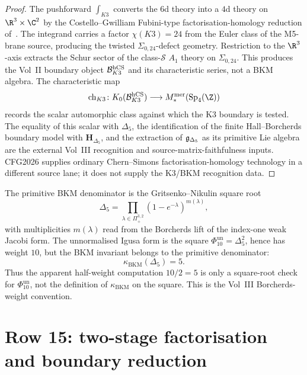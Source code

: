 \begin{proof}
The pushforward $\int_{K3}$ converts the
6d theory into a $4$d theory on $\R^3\times\C^2$ by the
Costello--Gwilliam Fubini-type factorisation-homology reduction
of~\cite[Ch.~3, \S3.6]{CG17}. The integrand carries a factor
$\chi(K3) = 24$ from the Euler class of the M5-brane source,
producing the twisted $\Sigma_{0,24}$-defect geometry. Restriction
to the $\R^3$-axis extracts the Schur sector of the
class-$\mathcal S$ $A_1$ theory on $\Sigma_{0,24}$. This produces the
Vol~II boundary object $\mathcal{B}^{\mathrm{hCS}}_{K3}$ and its characteristic series,
not a BKM algebra. The characteristic map
\[
 \mathrm{ch}_{K3}\colon
 K_0(\cB^{\hCS}_{K3}) \longrightarrow
 M^{\mathrm{mer}}_{\ast}(\mathrm{Sp}_4(\Z))
\]
records the scalar automorphic class against which the K3 boundary is
tested. The equality of this scalar with $\Delta_5$, the identification
of the finite Hall--Borcherds boundary model with
$\mathbf H_{\Delta_5}$, and the extraction of
$\mathfrak{g}_{\Delta_5}$ as its primitive Lie algebra are the external Vol~III
recognition and source-matrix-faithfulness inputs. CFG2026 supplies ordinary Chern--Simons
factorisation-homology technology in a different source lane; it does
not supply the K3/BKM recognition data.
\end{proof}

\begin{remark}
\label{rem:cfg-row-14-denominator}
The primitive BKM denominator is the Gritsenko--Nikulin square root
\[
  \Delta_5
  =
  \prod_{\lambda\in\Pi^{3,2}_+}(1-e^{-\lambda})^{m(\lambda)} ,
\]
with multiplicities \(m(\lambda)\) read from the Borcherds lift of the
index-one weak Jacobi form. The unnormalised Igusa form is the square
\(\Phi_{10}^{\mathrm{un}}=\Delta_5^2\), hence has weight \(10\), but
the BKM invariant belongs to the primitive denominator:
\[
  \kappa_{\mathrm{BKM}}(\Delta_5)=5 .
\]
Thus the apparent half-weight computation \(10/2=5\) is only a square-root
check for \(\Phi_{10}^{\mathrm{un}}\), not the definition of
\(\kappa_{\mathrm{BKM}}\) on the square. This is the Vol~III
Borcherds-weight convention.
\end{remark}

\section{Row 15: two-stage factorisation and boundary reduction}
\label{sec:cfg-row-15-two-stage}

